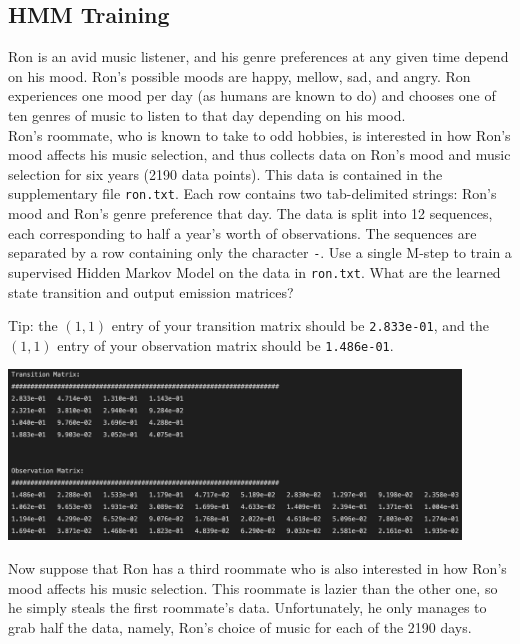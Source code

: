 \subsection{HMM Training}
Ron is an avid music listener, and his genre preferences at any given time depend on his mood. Ron's possible moods are happy, mellow, sad, and angry. Ron experiences one mood per day (as humans are known to do) and chooses one of ten genres of music to listen to that day depending on his mood. \\

Ron's roommate, who is known to take to odd hobbies, is interested in how Ron's mood affects his music selection, and thus collects data on Ron's mood and music selection for six years (2190 data points). This data is contained in the supplementary file \texttt{ron.txt}. Each row contains two tab-delimited strings: Ron's mood and Ron's genre preference that day. The data is split into 12 sequences, each corresponding to half a year's worth of observations. The sequences are separated by a row containing only the character \texttt{-}.
\noindent\problem[10] %
Use a single M-step to train a supervised Hidden Markov Model on the data in \texttt{ron.txt}. What are the learned state transition and output emission matrices?

Tip: the \((1,1)\) entry of your transition matrix should be \verb|2.833e-01|, and the \((1,1)\) entry of your observation matrix should be \verb|1.486e-01|.
\begin{solution}
  \begin{center}
    \includegraphics[width=0.9\textwidth]{prob2c.png}
  \end{center}
\end{solution}
\indent\problem[15] %
Now suppose that Ron has a third roommate who is also interested in how Ron's mood affects his music selection. This roommate is lazier than the other one, so he simply steals the first roommate's data. Unfortunately, he only manages to grab half the data, namely, Ron's choice of music for each of the 2190 days.

